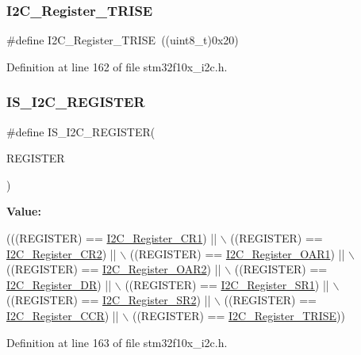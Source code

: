 \subsubsection{\texorpdfstring{I2\+C\+\_\+\+Register\+\_\+\+T\+R\+I\+SE}{I2C\_Register\_TRISE}}
{\footnotesize\ttfamily \#define I2\+C\+\_\+\+Register\+\_\+\+T\+R\+I\+SE~((uint8\+\_\+t)0x20)}



Definition at line 162 of file stm32f10x\+\_\+i2c.\+h.

\mbox{\label{group___i2_c__registers_ga37206b258f7930065c308ec7d35f243e}} 
\subsubsection{\texorpdfstring{I\+S\+\_\+\+I2\+C\+\_\+\+R\+E\+G\+I\+S\+T\+ER}{IS\_I2C\_REGISTER}}
{\footnotesize\ttfamily \#define I\+S\+\_\+\+I2\+C\+\_\+\+R\+E\+G\+I\+S\+T\+ER(\begin{DoxyParamCaption}\item[{}]{R\+E\+G\+I\+S\+T\+ER }\end{DoxyParamCaption})}

{\bfseries Value\+:}
\begin{DoxyCode}
(((REGISTER) == \hyperlink{group___i2_c__registers_ga4b9e7934e490c3540e50cf2f1d0a7688}{I2C\_Register\_CR1}) || \(\backslash\)
                                   ((REGISTER) == \hyperlink{group___i2_c__registers_gaf278337dd03b6ae56eac3f335381eca3}{I2C\_Register\_CR2}) || \(\backslash\)
                                   ((REGISTER) == \hyperlink{group___i2_c__registers_ga706317a00c0d450e95c00efd2afe1836}{I2C\_Register\_OAR1}) || \(\backslash\)
                                   ((REGISTER) == \hyperlink{group___i2_c__registers_gaffdc1902493456dea95216a39fc54e2b}{I2C\_Register\_OAR2}) || \(\backslash\)
                                   ((REGISTER) == \hyperlink{group___i2_c__registers_gaea281721e7a8461d90bf59898487c096}{I2C\_Register\_DR}) || \(\backslash\)
                                   ((REGISTER) == \hyperlink{group___i2_c__registers_gaf3bc5f4dc87513e2eceba4f503c14d6a}{I2C\_Register\_SR1}) || \(\backslash\)
                                   ((REGISTER) == \hyperlink{group___i2_c__registers_ga0b5f7949e449223ec97e0169d79d007d}{I2C\_Register\_SR2}) || \(\backslash\)
                                   ((REGISTER) == \hyperlink{group___i2_c__registers_ga7a0de765650408f3915b54141f052c5b}{I2C\_Register\_CCR}) || \(\backslash\)
                                   ((REGISTER) == \hyperlink{group___i2_c__registers_ga488c25a0a9f2c572af28768589fcbab2}{I2C\_Register\_TRISE}))
\end{DoxyCode}


Definition at line 163 of file stm32f10x\+\_\+i2c.\+h.

